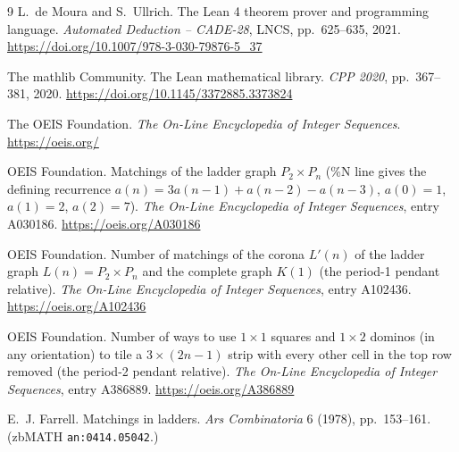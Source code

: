 \documentclass[11pt]{article}
\begin{document}
\begin{thebibliography}{9}
L.~de Moura and S.~Ullrich.
\newblock The Lean 4 theorem prover and programming language.
\newblock \emph{Automated Deduction -- CADE-28}, LNCS, pp.~625--635, 2021.
\url{https://doi.org/10.1007/978-3-030-79876-5_37}

The mathlib Community.
\newblock The Lean mathematical library.
\newblock \emph{CPP 2020}, pp.~367--381, 2020.
\url{https://doi.org/10.1145/3372885.3373824}

The OEIS Foundation.
\newblock \emph{The On-Line Encyclopedia of Integer Sequences}.
\newblock \url{https://oeis.org/}

OEIS Foundation.
\newblock Matchings of the ladder graph $P_2\times P_n$ (\%N line gives the
defining recurrence $a(n)=3a(n-1)+a(n-2)-a(n-3)$, $a(0)=1$, $a(1)=2$,
$a(2)=7$).
\newblock \emph{The On-Line Encyclopedia of Integer Sequences}, entry
A030186.
\url{https://oeis.org/A030186}

OEIS Foundation.
\newblock Number of matchings of the corona $L'(n)$ of the ladder graph
$L(n)=P_2\times P_n$ and the complete graph $K(1)$ (the period-1 pendant
relative).
\newblock \emph{The On-Line Encyclopedia of Integer Sequences}, entry
A102436.
\url{https://oeis.org/A102436}

OEIS Foundation.
\newblock Number of ways to use $1\times 1$ squares and $1\times 2$ dominos
(in any orientation) to tile a $3\times(2n-1)$ strip with every other cell
in the top row removed (the period-2 pendant relative).
\newblock \emph{The On-Line Encyclopedia of Integer Sequences}, entry
A386889.
\url{https://oeis.org/A386889}

E.~J. Farrell.
\newblock Matchings in ladders.
\newblock \emph{Ars Combinatoria} 6 (1978), pp.~153--161.
\newblock (zbMATH \texttt{an:0414.05042}.)

\end{thebibliography}
\end{document}
